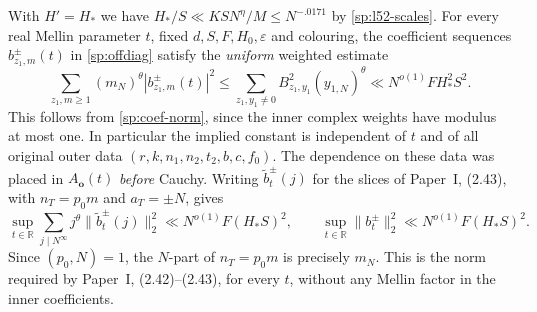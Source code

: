 With $H'=H_*$ we have $H_*/S\ll KSN^\eta/M\le N^{-.0171}$ by
\eqref{sp:l52-scales}. For every real Mellin parameter $t$, fixed
$d,S,F,H_0,\varepsilon$ and colouring, the coefficient sequences
$b^{\pm}_{z_1,m}(t)$ in \eqref{sp:offdiag} satisfy the \emph{uniform}
weighted estimate
\[
 \sum_{z_1,m\ge1}(m_N)^\theta
 |b^{\pm}_{z_1,m}(t)|^2
 \le\sum_{z_1,y_1\ne0}B_{z_1,y_1}^2(y_{1,N})^\theta
 \ll N^{o(1)}F H_*^2S^2.
\]
This follows from \eqref{sp:coef-norm}, since the inner complex
weights have modulus at most one. In particular the implied constant
is independent of $t$ and of all original outer data
$(r,k,n_1,n_2,t_2,b,c,f_0)$. The dependence on these data was
placed in $A_{\mathbf o}(t)$ \emph{before} Cauchy.
Writing $\widetilde b_t^{\pm}(j)$ for the slices of Paper~I,
(2.43), with $n_T=p_0m$ and $a_T=\pm N$, gives
\begin{equation}\label{sp:slices}
 \sup_{t\in\mathbb R}\sum_{j\mid N^\infty}j^\theta
 \|\widetilde b_t^{\pm}(j)\|_2^2
 \ll N^{o(1)}F(H_*S)^2,
 \qquad \sup_{t\in\mathbb R}\|b_t^{\pm}\|_2^2
 \ll N^{o(1)}F(H_*S)^2.
\end{equation}
Since $(p_0,N)=1$, the $N$-part of $n_T=p_0m$ is precisely
$m_N$. This is the norm required by Paper~I, (2.42)--(2.43), for
every $t$, without any Mellin factor in the inner coefficients.

